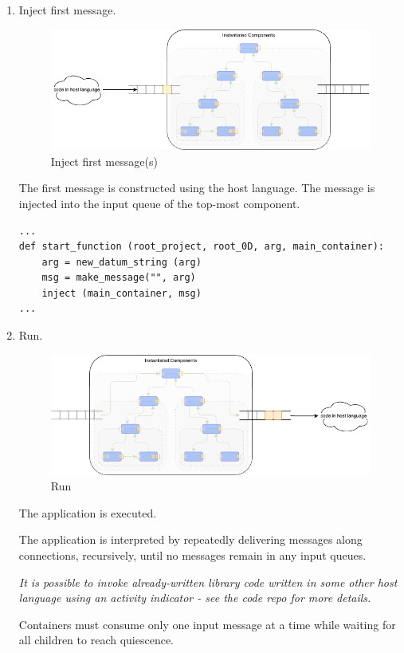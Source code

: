 \documentclass[10pt,anonymous,review]{acmart}
\begin{document}
\begin{enumerate}
\item Inject first message.
  \begin{figure}[h]
    \centering
    \includegraphics[width=0.8\linewidth]{./media/image5.png}
    \caption{Inject first message(s)}
    \label{fig:inject_first_message}
  \end{figure}

The first message is constructed using the host language. The message is
injected\cite{main} into the input queue of the top-most component.

\begin{verbatim}
...
def start_function (root_project, root_0D, arg, main_container):
    arg = new_datum_string (arg)
    msg = make_message("", arg)
    inject (main_container, msg)
...
\end{verbatim}
  
\item Run.
  \begin{figure}[h]
    \centering
    \includegraphics[width=0.8\linewidth]{./media/image7.png}
    \caption{Run}
    \label{fig:run}
  \end{figure}
The application is executed.

The application is interpreted by repeatedly delivering messages along
connections, recursively, until no messages remain in any input queues.

\emph{It is possible to invoke already-written library code written in some other host language using an activity indicator - see the code repo for more details.}

Containers must consume only one input message at a time while waiting
for all children to reach quiescence.


\end{enumerate}
\end{document}
